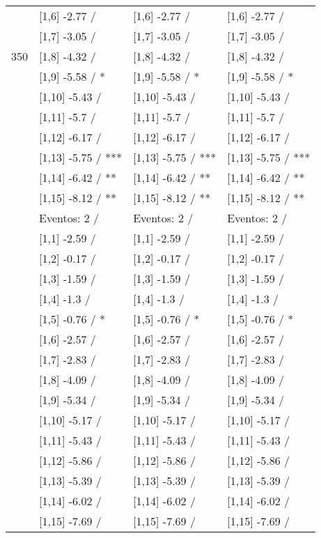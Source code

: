 \begin{table}
\begin{tabular}[t]{llll}
 & {}[1,6] -2.77  / & {}[1,6] -2.77  / & {}[1,6] -2.77  /\\
 & {}[1,7] -3.05  / & {}[1,7] -3.05  / & {}[1,7] -3.05  /\\
350 & {}[1,8] -4.32  / & {}[1,8] -4.32  / & {}[1,8] -4.32  /\\
\addlinespace
 & {}[1,9] -5.58  / * & {}[1,9] -5.58  / * & {}[1,9] -5.58  / *\\
 & {}[1,10] -5.43  / & {}[1,10] -5.43  / & {}[1,10] -5.43  /\\
 & {}[1,11] -5.7  / & {}[1,11] -5.7  / & {}[1,11] -5.7  /\\
 & {}[1,12] -6.17  / & {}[1,12] -6.17  / & {}[1,12] -6.17  /\\
 & {}[1,13] -5.75  / *** & {}[1,13] -5.75  / *** & {}[1,13] -5.75  / ***\\
\addlinespace
 & {}[1,14] -6.42  / ** & {}[1,14] -6.42  / ** & {}[1,14] -6.42  / **\\
 & {}[1,15] -8.12  / ** & {}[1,15] -8.12  / ** & {}[1,15] -8.12  / **\\
 & Eventos:  2 / & Eventos:  2 / & Eventos:  2 /\\
 & {}[1,1] -2.59  / & {}[1,1] -2.59  / & {}[1,1] -2.59  /\\
 & {}[1,2] -0.17  / & {}[1,2] -0.17  / & {}[1,2] -0.17  /\\
\addlinespace
 & {}[1,3] -1.59  / & {}[1,3] -1.59  / & {}[1,3] -1.59  /\\
 & {}[1,4] -1.3  / & {}[1,4] -1.3  / & {}[1,4] -1.3  /\\
 & {}[1,5] -0.76  / * & {}[1,5] -0.76  / * & {}[1,5] -0.76  / *\\
 & {}[1,6] -2.57  / & {}[1,6] -2.57  / & {}[1,6] -2.57  /\\
 & {}[1,7] -2.83  / & {}[1,7] -2.83  / & {}[1,7] -2.83  /\\
\addlinespace
500 & {}[1,8] -4.09  / & {}[1,8] -4.09  / & {}[1,8] -4.09  /\\
 & {}[1,9] -5.34  / & {}[1,9] -5.34  / & {}[1,9] -5.34  /\\
 & {}[1,10] -5.17  / & {}[1,10] -5.17  / & {}[1,10] -5.17  /\\
 & {}[1,11] -5.43  / & {}[1,11] -5.43  / & {}[1,11] -5.43  /\\
 & {}[1,12] -5.86  / & {}[1,12] -5.86  / & {}[1,12] -5.86  /\\
\addlinespace
 & {}[1,13] -5.39  / & {}[1,13] -5.39  / & {}[1,13] -5.39  /\\
 & {}[1,14] -6.02  / & {}[1,14] -6.02  / & {}[1,14] -6.02  /\\
 & {}[1,15] -7.69  / & {}[1,15] -7.69  / & {}[1,15] -7.69  /\\
\bottomrule
\end{tabular}
\end{table}
